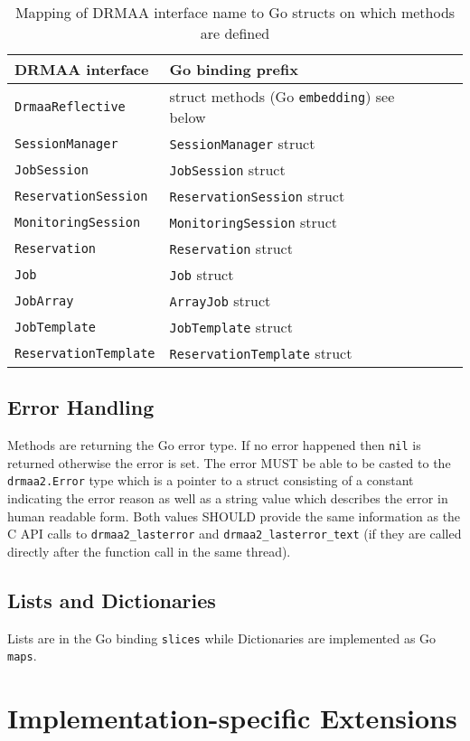 \documentclass{article}
\newcommand{\h}[1]{\texttt{#1}}
\begin{document}
\begin{table}[ht]
\centering
\begin{tabularx}{\textwidth}{|X|X|l|X|}
\hline
DRMAA interface & Go binding prefix \\
\hline
\h{DrmaaReflective} & struct methods (Go \h{embedding}) see below \\
\h{SessionManager} & \h{SessionManager} struct \\
\h{JobSession} & \h{JobSession} struct \\
\h{ReservationSession} & \h{ReservationSession} struct \\
\h{MonitoringSession}  & \h{MonitoringSession} struct \\
\h{Reservation} & \h{Reservation} struct \\
\h{Job} & \h{Job} struct \\
\h{JobArray} & \h{ArrayJob} struct \\
\h{JobTemplate} & \h{JobTemplate} struct \\
\h{ReservationTemplate} & \h{ReservationTemplate} struct \\
\hline
\end{tabularx}
\caption{Mapping of DRMAA interface name to Go structs on which methods are defined}
\label{tab:naming}
\end{table}

\subsection{Error Handling}

Methods are returning the Go error type. If no error happened then \h{nil} is returned otherwise the error is set. The error MUST be able to be casted to the \h{drmaa2.Error} type which is a pointer to a struct consisting of a constant indicating the error reason as well as a string value which describes the error in human readable form. Both values SHOULD provide the same information as the C API calls to \h{drmaa2\_lasterror} and \h{drmaa2\_lasterror\_text} (if they are called directly after the function call in the same thread).

\subsection{Lists and Dictionaries}

Lists are in the Go binding \h{slices} while Dictionaries are implemented as Go \h{maps}.

\section{Implementation-specific Extensions}
\end{document}
